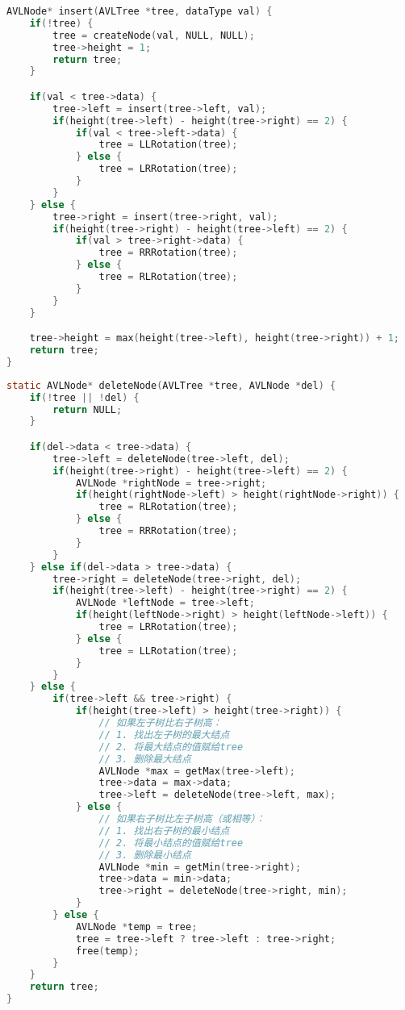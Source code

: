 
\begin{lstlisting}[language=C]
AVLNode* insert(AVLTree *tree, dataType val) {
    if(!tree) {
        tree = createNode(val, NULL, NULL);
        tree->height = 1;
        return tree;
    }

    if(val < tree->data) {
        tree->left = insert(tree->left, val);
        if(height(tree->left) - height(tree->right) == 2) {
            if(val < tree->left->data) {
                tree = LLRotation(tree);
            } else {
                tree = LRRotation(tree);
            }
        }
    } else {
        tree->right = insert(tree->right, val);
        if(height(tree->right) - height(tree->left) == 2) {
            if(val > tree->right->data) {
                tree = RRRotation(tree);
            } else {
                tree = RLRotation(tree);
            }
        }
    }

    tree->height = max(height(tree->left), height(tree->right)) + 1;
    return tree;
}
\end{lstlisting}


\begin{lstlisting}[language=C]
static AVLNode* deleteNode(AVLTree *tree, AVLNode *del) {
    if(!tree || !del) {
        return NULL;
    }

    if(del->data < tree->data) {
        tree->left = deleteNode(tree->left, del);
        if(height(tree->right) - height(tree->left) == 2) {
            AVLNode *rightNode = tree->right;
            if(height(rightNode->left) > height(rightNode->right)) {
                tree = RLRotation(tree);
            } else {
                tree = RRRotation(tree);
            }
        }
    } else if(del->data > tree->data) {
        tree->right = deleteNode(tree->right, del);
        if(height(tree->left) - height(tree->right) == 2) {
            AVLNode *leftNode = tree->left;
            if(height(leftNode->right) > height(leftNode->left)) {
                tree = LRRotation(tree);
            } else {
                tree = LLRotation(tree);
            }
        }
    } else {
        if(tree->left && tree->right) {
            if(height(tree->left) > height(tree->right)) {
                // 如果左子树比右子树高：
                // 1. 找出左子树的最大结点
                // 2. 将最大结点的值赋给tree
                // 3. 删除最大结点
                AVLNode *max = getMax(tree->left);
                tree->data = max->data;
                tree->left = deleteNode(tree->left, max);
            } else {
                // 如果右子树比左子树高（或相等）：
                // 1. 找出右子树的最小结点
                // 2. 将最小结点的值赋给tree
                // 3. 删除最小结点
                AVLNode *min = getMin(tree->right);
                tree->data = min->data;
                tree->right = deleteNode(tree->right, min);
            }
        } else {
            AVLNode *temp = tree;
            tree = tree->left ? tree->left : tree->right;
            free(temp);
        }
    }
    return tree;
}
\end{lstlisting}

